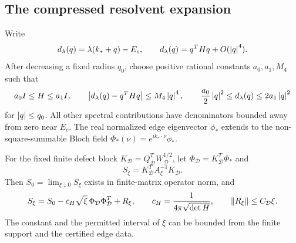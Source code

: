 \subsection{The compressed resolvent expansion}

Write
\[
 d_\lambda(q)=\lambda(k_*+q)-E_c,\qquad
 d_\lambda(q)=q^THq+O(\left\lvert q\right\rvert^4).
\]
After decreasing a fixed radius \(q_0\), choose positive rational constants
\(a_0,a_1,M_4\) such that
\[
 a_0I\le H\le a_1I,\qquad
 \left\lvert d_\lambda(q)-q^THq\right\rvert\le M_4\left\lvert q\right\rvert^4,\qquad
 \frac{a_0}{2}\left\lvert q\right\rvert^2\le d_\lambda(q)\le2a_1\left\lvert q\right\rvert^2
\]
for \(\left\lvert q\right\rvert\le q_0\). All other spectral contributions have denominators
bounded away from zero near \(E_c\). The real normalized edge eigenvector
\(\phi_*\) extends to the non-square-summable Bloch field
\(\Phi_*(\nu)=e^{ik_*\cdot\nu}\phi_*\).

\begin{lemma}
\label{d:lem:physical-square-root}
For the fixed finite defect block \(K_{\mathcal D}=Q_{\mathcal D}^TW_{\mathcal D}^{1/2}\), let
\(\Phi_{\mathcal D}=K_{\mathcal D}^T\Phi_*\) and
\[
 S_\xi=K_{\mathcal D}^TA_\xi^{-1}K_{\mathcal D}.
\]
Then \(S_0=\lim_{\xi\downarrow0}S_\xi\) exists in finite-matrix operator
norm, and
\begin{equation}
 S_\xi=S_0-c_H\sqrt{\xi}\,\Phi_{\mathcal D}\Phi_{\mathcal D}^T+R_\xi,\qquad
 c_H=\frac1{4\pi\sqrt{\det H}},\qquad
 \left\lVert R_\xi\right\rVert\le C_{\mathcal D}\xi.
 \label{d:eq:appendix-edge-root}
\end{equation}
The constant and the permitted interval of \(\xi\) can be bounded from
the finite support and the certified edge data.
\end{lemma}

